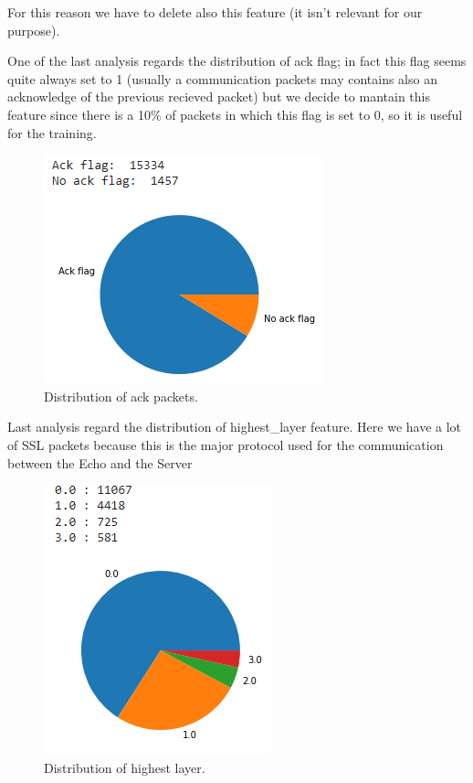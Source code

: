 \documentclass[sigconf]{acmart}
\begin{document}
For this reason we have to delete also this feature (it isn't relevant for our purpose).

One of the last analysis regards the distribution of ack flag; in fact this flag seems quite always set to 1 (usually a communication packets may contains also an acknowledge of the previous recieved packet) but we decide to mantain this feature since there is a 10\% of packets in which this flag is set to 0, so it is useful for the training.
\begin{figure}[h!]
            \includegraphics[width=0.8\linewidth]{img/ack_no_ack.png}
            \caption{Distribution of ack packets.}
            \label{fig:ack_not_ack}
        \end{figure}

Last analysis regard the distribution of highest\_layer feature. Here we have a lot of SSL packets because this is the major protocol used for the communication between the Echo and the Server
	\begin{figure}[h!]
            \includegraphics[width=0.8\linewidth]{img/highest_layer.png}
            \caption{Distribution of highest layer.}
            \label{fig:highest_layer}
        \end{figure}
\end{document}
